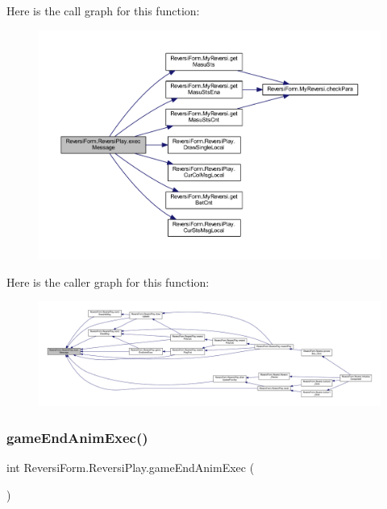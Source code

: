 Here is the call graph for this function\+:\nopagebreak
\begin{figure}[H]
\begin{center}
\leavevmode
\includegraphics[width=350pt]{class_reversi_form_1_1_reversi_play_aa7cf1089065bff85997d057210312ae8_cgraph}
\end{center}
\end{figure}
Here is the caller graph for this function\+:\nopagebreak
\begin{figure}[H]
\begin{center}
\leavevmode
\includegraphics[width=350pt]{class_reversi_form_1_1_reversi_play_aa7cf1089065bff85997d057210312ae8_icgraph}
\end{center}
\end{figure}
\mbox{\label{class_reversi_form_1_1_reversi_play_aec95b109a53b3cdab6466a4fca52f967}} 
\subsubsection{\texorpdfstring{game\+End\+Anim\+Exec()}{gameEndAnimExec()}}
{\footnotesize\ttfamily int Reversi\+Form.\+Reversi\+Play.\+game\+End\+Anim\+Exec (\begin{DoxyParamCaption}{ }\end{DoxyParamCaption})}



